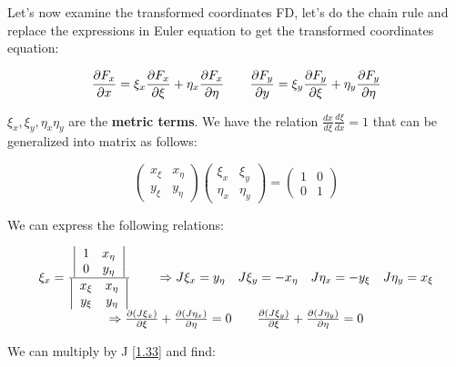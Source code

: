 Let's now examine the transformed coordinates FD, let's do the chain rule and replace the expressions in Euler equation to get the transformed coordinates equation: 

\begin{equation}
\frac{\partial F_x}{\partial x} = \xi _x\frac{\partial F_x}{\partial \xi} + \eta _x\frac{\partial F_x}{\partial \eta}\qquad \frac{\partial F_y}{\partial y} = \xi _y\frac{\partial F_y}{\partial \xi} + \eta _y\frac{\partial F_y}{\partial \eta}
\label{1.33}
\end{equation}

$\xi _x, \xi _y, \eta _x \eta _y$ are the \textbf{metric terms}. We have the relation $\frac{dx}{d\xi} \frac{d\xi}{dx} = 1$ that can be generalized into matrix as follows: 

\begin{equation}
\left( 
\begin{array}{cc}
x _\xi & x_\eta\\
y _\xi & y_\eta
\end{array}
\right)
\left( 
\begin{array}{cc}
\xi _x & \xi _y\\
\eta _x & \eta _y
\end{array}
\right)
=
\left( 
\begin{array}{cc}
1 & 0\\
0 & 1
\end{array}
\right)
\end{equation}

We can express the following relations: 

\begin{equation}
\begin{array}{c}
\xi _x = \frac{\left| 
\begin{array}{cc}
1 & x_\eta\\
0 & y_\eta
\end{array}
\right|}{\left|
\begin{array}{cc}
x _\xi & x_\eta\\
y _\xi & y_\eta
\end{array}
\right|}
\qquad \Rightarrow J\xi _x = y_\eta \quad J\xi _y = -x_\eta \quad J\eta _x = -y_\xi \quad J\eta _y = x_\xi
\\
\Rightarrow \frac{\partial (J\xi _x)}{\partial \xi} + \frac{\partial (J\eta_x)}{\partial \eta} = 0 \qquad \frac{\partial (J\xi _y)}{\partial \xi} + \frac{\partial (J\eta_y)}{\partial \eta} = 0
\end{array}
\end{equation}

We can multiply by J \eqref{1.33} and find: 


